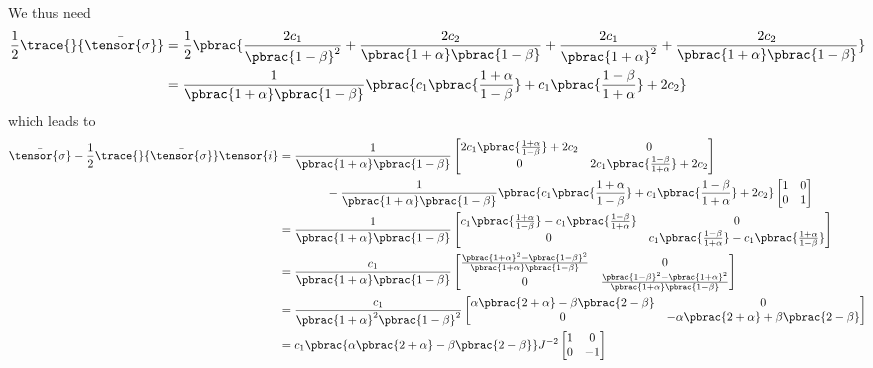 We thus need
\begin{equation}
  \begin{split}
    \frac{1}{2}\trace{}{\bar{\tensor{\sigma}}}&=\frac{1}{2}\pbrac{\frac{2c_{1}}{\pbrac{1-\beta}^{2}}+\frac{2c_{2}}{\pbrac{1+\alpha}\pbrac{1-\beta}}+\frac{2c_{1}}{\pbrac{1+\alpha}^{2}}+\frac{2c_{2}}{\pbrac{1+\alpha}\pbrac{1-\beta}}}\\
    &=\dfrac{1}{\pbrac{1+\alpha}\pbrac{1-\beta}}\pbrac{c_{1}\pbrac{\frac{1+\alpha}{1-\beta}}+c_{1}\pbrac{\frac{1-\beta}{1+\alpha}}+2c_{2}}
  \end{split}
\end{equation}
which leads to
\begin{equation}
  \begin{split}
    \bar{\tensor{\sigma}}-\frac{1}{2}\trace{}{\bar{\tensor{\sigma}}}\tensor{i}&=\dfrac{1}{\pbrac{1+\alpha}\pbrac{1-\beta}}\begin{bmatrix}
      2c_{1}\pbrac{\frac{1+\alpha}{1-\beta}}+2c_{2} & 0 \\
      0 & 2c_{1}\pbrac{\frac{1-\beta}{1+\alpha}}+2c_{2}
    \end{bmatrix}\\
    &\qquad\qquad-\dfrac{1}{\pbrac{1+\alpha}\pbrac{1-\beta}}\pbrac{c_{1}\pbrac{\frac{1+\alpha}{1-\beta}}+c_{1}\pbrac{\frac{1-\beta}{1+\alpha}}+2c_{2}}\begin{bmatrix}
      1 & 0 \\
      0 & 1
    \end{bmatrix} \\
    &=\dfrac{1}{\pbrac{1+\alpha}\pbrac{1-\beta}}\begin{bmatrix}
      c_{1}\pbrac{\frac{1+\alpha}{1-\beta}}-c_{1}\pbrac{\frac{1-\beta}{1+\alpha}} & 0 \\
      0 & c_{1}\pbrac{\frac{1-\beta}{1+\alpha}}-c_{1}\pbrac{\frac{1+\alpha}{1-\beta}}
    \end{bmatrix} \\
    &=\dfrac{c_{1}}{\pbrac{1+\alpha}\pbrac{1-\beta}}\begin{bmatrix}
      \frac{\pbrac{1+\alpha}^{2}-\pbrac{1-\beta}^{2}}{\pbrac{1+\alpha}\pbrac{1-\beta}} & 0 \\
      0 & \frac{\pbrac{1-\beta}^{2}-\pbrac{1+\alpha}^{2}}{\pbrac{1+\alpha}\pbrac{1-\beta}}
    \end{bmatrix}\\
    &=\dfrac{c_{1}}{\pbrac{1+\alpha}^{2}\pbrac{1-\beta}^{2}}\begin{bmatrix}
      \alpha\pbrac{2+\alpha}-\beta\pbrac{2-\beta} & 0 \\
      0 & -\alpha\pbrac{2+\alpha}+\beta\pbrac{2-\beta}
    \end{bmatrix} \\
    &=c_{1}\pbrac{\alpha\pbrac{2+\alpha}-\beta\pbrac{2-\beta}}J^{-2}\begin{bmatrix}
      1 & 0 \\
      0 & -1
    \end{bmatrix}
  \end{split}
\end{equation}

